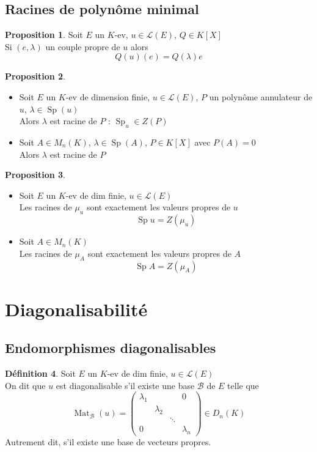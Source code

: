 \documentclass[10pt,a4paper]{article}
\theoremstyle{definition}
\newtheorem{proposition}{Proposition}[section]
\newtheorem{definition}[proposition]{Définition}
\DeclareMathOperator{\Sp}{Sp}
\DeclareMathOperator*{\Mat}{Mat}
\begin{document}
\subsection{Racines de polynôme minimal}
\begin{proposition}
Soit $E$ un $K$-ev, $u \in \mathcal{L}(E)$, $Q \in K[X]$ \\
Si $(e, \lambda)$ un couple propre de $u$ alors 
\[ \boxed{Q(u)(e) = Q(\lambda)e} \]
\end{proposition}
\begin{proposition}
\hfill \begin{itemize}
\item Soit $E$ un $K$-ev de dimension finie, $u \in \mathcal{L}(E)$, $P$ un polynôme annulateur de $u$, $\lambda \in \Sp(u)$ \\
Alors $\lambda$ est racine de $P$ : $\Sp_u \in Z(P)$
\item Soit $A \in M_n(K)$, $\lambda \in \Sp(A)$, $P \in K[X]$ avec $P(A) = 0$ \\
Alors $\lambda$ est racine de $P$
\end{itemize}
\end{proposition}
\begin{proposition}
\hfill \begin{itemize}
\item Soit $E$ un $K$-ev de dim finie, $u \in \mathcal{L}(E)$ \\
Les racines de $\mu_u$ sont exactement les valeurs propres de $u$
\[ \boxed{\Sp u = Z(\mu_u)} \]
\item Soit $A \in M_n(K)$ \\
Les racines de $\mu_A$ sont exactement les valeurs propres de $A$
\[ \boxed{\Sp A = Z(\mu_A)} \]
\end{itemize}
\end{proposition}

\section{Diagonalisabilité}
\subsection{Endomorphismes diagonalisables}
\begin{definition}
Soit $E$ un $K$-ev de dim finie, $u \in \mathcal{L}(E)$ \\
On dit que $u$ est diagonalisable s'il existe une base $\mathcal{B}$ de $E$ telle que 
\[ \Mat_\mathcal{B}(u) = \begin{pmatrix}
\lambda_1 & & & 0 \\
& \lambda_2 & & \\
& & \ddots & \\
0 & & & \lambda_n
\end{pmatrix} \in D_n(K) \]
Autrement dit, s'il existe une base de vecteurs propres.
\end{definition}
\end{document}
